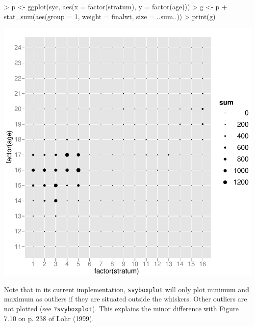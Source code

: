 \documentclass[article, 11pt, oneside]{memoir}
\begin{document}
\begin{Schunk}
\begin{Sinput}
> p <- ggplot(syc, aes(x = factor(stratum), y = factor(age)))
> g <- p + stat_sum(aes(group = 1, weight = finalwt, size = ..sum..))
> print(g)
\end{Sinput}
\end{Schunk}
\includegraphics{SDA_using_survey-015}

     
Note that in its current implementation, \texttt{svyboxplot} will
only plot minimum and maximum as outliers if they are situated 
outside the whiskers. Other outliers are not plotted 
(see \texttt{?svyboxplot}). This explains the minor difference with
Figure 7.10 on p. 238 of Lohr (1999).
 
\end{document}
